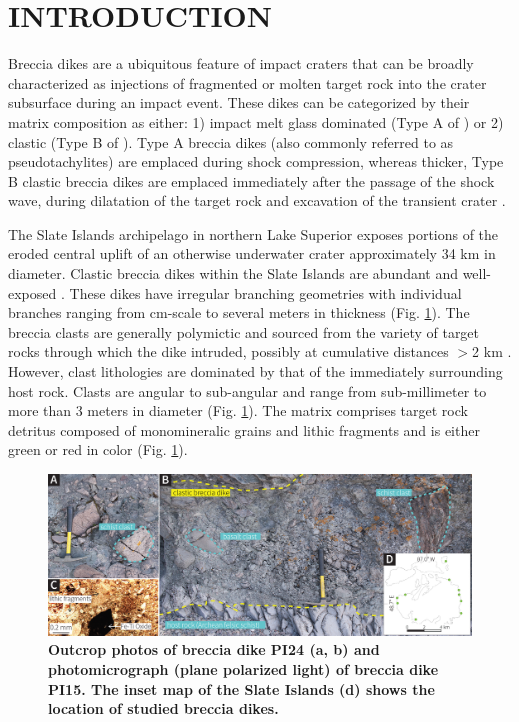 \documentclass[11pt,letterpaper]{article}
\begin{document}
\section*{INTRODUCTION}
Breccia dikes are a ubiquitous feature of impact craters that can be broadly characterized as injections of fragmented or molten target rock into the crater subsurface during an impact event. These dikes can be categorized by their matrix composition as either: 1) impact melt glass dominated (Type A of \cite{Lambert1981a}) or 2) clastic (Type B of \cite{Lambert1981a}). Type A breccia dikes (also commonly referred to as pseudotachylites) are emplaced during shock compression, whereas thicker, Type B clastic breccia dikes are emplaced immediately after the passage of the shock wave, during dilatation of the target rock and excavation of the transient crater \citep{Lambert1981a, Masaitis2005a}.

The Slate Islands archipelago in northern Lake Superior exposes portions of the eroded central uplift of an otherwise underwater crater approximately 34 km in diameter. Clastic breccia dikes within the Slate Islands are abundant and well-exposed \citep{Dressler1997a}. These dikes have irregular branching geometries with individual branches ranging from cm-scale to several meters in thickness (Fig. \ref{fig:photo}). The breccia clasts are generally polymictic and sourced from the variety of target rocks through which the dike intruded, possibly at cumulative distances $>$2 km \citep{Dressler1997a}. However, clast lithologies are dominated by that of the immediately surrounding host rock. Clasts are angular to sub-angular and range from sub-millimeter to more than 3 meters in diameter (Fig. \ref{fig:photo}). The matrix comprises target rock detritus composed of monomineralic grains and lithic fragments and is either green or red in color (Fig. \ref{fig:photo}).

\begin{figure}
\noindent\includegraphics[width=\textwidth]{figures/Breccia_Dike_Photos.jpg}

\caption{\footnotesize{\textbf{Outcrop photos of breccia dike PI24 (a, b) and photomicrograph (plane polarized light) of breccia dike PI15. The inset map of the Slate Islands (d) shows the location of studied breccia dikes.}}}
\label{fig:photo}
\end{figure}
\end{document}
